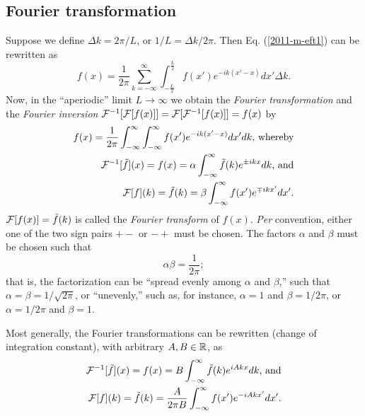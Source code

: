 \subsection{Fourier transformation}

Suppose we define
$\Delta {k} = 2\pi /L$, or $1/L = \Delta {k} /2\pi$.
Then Eq. (\ref{2011-m-eft1}) can be rewritten  as
\begin{equation}
f(x)= \frac{1}{2\pi}
\sum _{k=-\infty}^\infty  \int_{-\frac{L}{2}}^\frac{L}{2} f(x') e^{-i{{k}(x'-x)}} dx' \Delta {k}
.
\end{equation}
Now,
in the ``aperiodic'' limit $L\rightarrow \infty$ we obtain  the {\em Fourier transformation}
and the {\em Fourier inversion}
$
{\cal F}^{-1}[{\cal F} [f(x)]]=
{\cal F} [{\cal F}^{-1}[f(x)]]= f(x)
$
by
\begin{equation}
\begin{split}
f(x)= \frac{1}{2\pi}
 \int_{-\infty}^\infty   \int_{-\infty}^\infty f(x') e^{-i{{k}(x'-x)}} dx' d{k} \textrm{, whereby} \\
  {\cal F}^{-1}[\tilde{f}](x)=f(x)=  \alpha \int_{-\infty}^\infty \tilde{f}(k) e^{\pm i{kx}} dk \textrm{, and} \\
 {\cal F}[f](k)=\tilde{f}(k)=  \beta \int_{-\infty}^\infty  f(x') e^{\mp i{kx'}} dx'
.
\end{split}
\label{2011-m-efta}
\end{equation}
$ {\cal F}[f(x)]= \tilde{f}(k)$
is called the {\em Fourier transform}
of $f(x)$.
{\em Per} convention, either one of the two sign pairs $+-$ or $-+$ must be chosen.
The factors $\alpha$ and $\beta$ must be chosen such that
\begin{equation}
 \alpha  \beta    = \frac{1}{2\pi};
\label{2011-m-efta1}
\end{equation}
that is, the factorization can be ``spread evenly among $\alpha$ and $\beta$,''
such that  $\alpha=\beta=1/\sqrt{2\pi}$, or ``unevenly,''
such as, for instance,
 $\alpha=1$ and $\beta=1/ 2\pi $,
or    $\alpha=1/ 2\pi $ and $\beta=1$.


Most generally, the Fourier transformations can be rewritten (change of integration constant),
 with arbitrary $A,B\in {\Bbb R}$,
as
\begin{equation}
\begin{split}
 {\cal F}^{-1}[\tilde{f}](x)=f(x)= B \int_{-\infty}^\infty \tilde{f}(k) e^{  iA{kx}} dk \textrm{, and} \\
 {\cal F}[f](k)=\tilde{f}(k)=  \frac{A}{2\pi B} \int_{-\infty}^\infty  f(x') e^{- iA{kx'}} dx'
.
\end{split}
\label{2011-m-efta1mg}
\end{equation}

